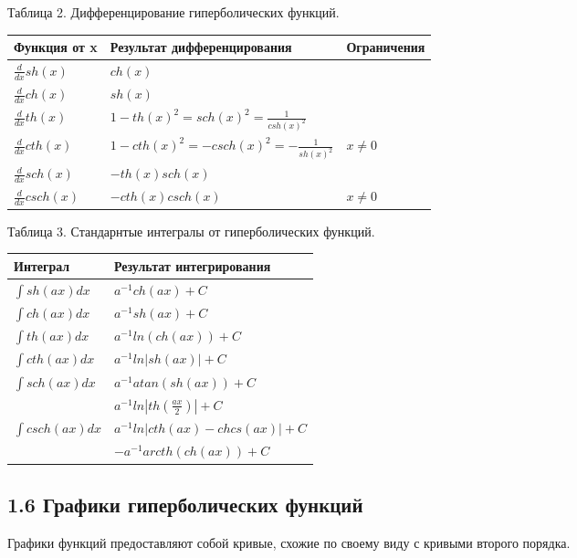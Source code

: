 Таблица 2. Дифференцирование гиперболических функций.
\begin{center}
    \begin{tabular}{| p{3cm} | p{7cm} | p{3cm} |}
        \hline
        Функция от x & Результат дифференцирования & Ограничения\\ \hline
        $\frac{d}{dx}sh(x)$ & $ch(x)$ & \\ \hline
        $\frac{d}{dx}ch(x)$ & $sh(x)$ & \\ \hline
        $\frac{d}{dx}th(x)$ & $1-th(x)^2=sch(x)^2=\frac{1}{csh(x)^2}$ & \\ \hline
        $\frac{d}{dx}cth(x)$ & $1-cth(x)^2=-csch(x)^2=-\frac{1}{sh(x)^2}$ & $x\neq0$\\ \hline
        $\frac{d}{dx}sch(x)$ & $-th(x)sch(x)$ & \\ \hline
        $\frac{d}{dx}csch(x)$ & $-cth(x)csch(x)$ & $x\neq0$\\ \hline
    \end{tabular}
\end{center}

Таблица 3. Стандарнтые интегралы от гиперболических функций.
\begin{center}
    \begin{tabular}{| p{5cm} | p{7cm} |}
        \hline
        Интеграл & Результат интегрирования\\ \hline
       $\int sh(ax) dx$ & $a^{-1}ch(ax)+C$\\ \hline
       $\int ch(ax) dx$ & $a^{-1}sh(ax)+C$\\ \hline
       $\int th(ax) dx$ & $a^{-1}ln(ch(ax))+C$\\ \hline
       $\int cth(ax) dx$ & $a^{-1}ln|sh(ax)|+C$\\ \hline
       $\int sch(ax) dx$ & $a^{-1}atan(sh(ax))+C$\\ \hline
        & $a^{-1}ln|th(\frac{ax}{2})|+C$\\ 
       $\int csch(ax) dx$ & $a^{-1}ln|cth(ax)-chcs(ax)|+C$\\ 
        & $-a^{-1}arcth(ch(ax))+C$\\ \hline
    \end{tabular}
\end{center}

\subsection*{1.6 Графики гиперболических функций}
Графики функций предоставляют собой кривые, схожие по своему виду с кривыми второго порядка.

